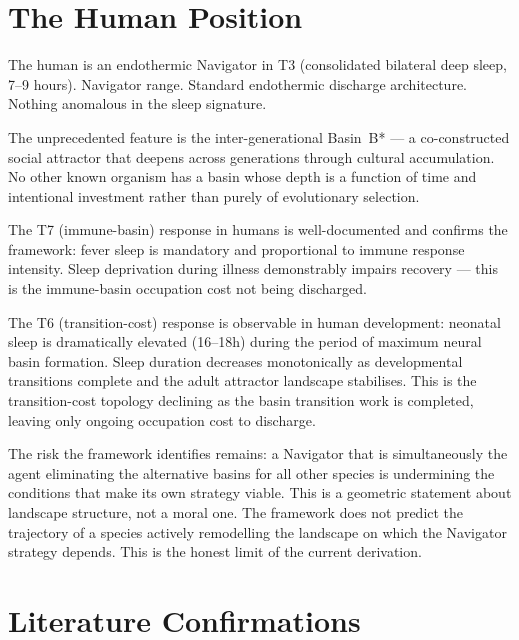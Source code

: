 \documentclass[10pt, a4paper]{article}
\begin{document}
\section{The Human Position}
\label{sec:human}

The human is an endothermic Navigator
in T3 (consolidated bilateral deep sleep,
7--9 hours). Navigator range. Standard
endothermic discharge architecture.
Nothing anomalous in the sleep signature.

The unprecedented feature is the
inter-generational Basin~B* --- a
co-constructed social attractor that
deepens across generations through
cultural accumulation. No other known
organism has a basin whose depth is a
function of time and intentional
investment rather than purely of
evolutionary selection.

The T7 (immune-basin) response in humans
is well-documented and confirms the
framework: fever sleep is mandatory and
proportional to immune response intensity.
Sleep deprivation during illness
demonstrably impairs recovery --- this
is the immune-basin occupation cost
not being discharged.

The T6 (transition-cost) response is
observable in human development: neonatal
sleep is dramatically elevated (16--18h)
during the period of maximum neural basin
formation. Sleep duration decreases
monotonically as developmental transitions
complete and the adult attractor landscape
stabilises. This is the transition-cost
topology declining as the basin transition
work is completed, leaving only ongoing
occupation cost to discharge.

The risk the framework identifies remains:
a Navigator that is simultaneously the
agent eliminating the alternative basins
for all other species is undermining the
conditions that make its own strategy
viable. This is a geometric statement
about landscape structure, not a moral
one. The framework does not predict the
trajectory of a species actively remodelling
the landscape on which the Navigator
strategy depends. This is the honest limit
of the current derivation.

\section{Literature Confirmations}
\label{sec:confirmations}
\end{document}
